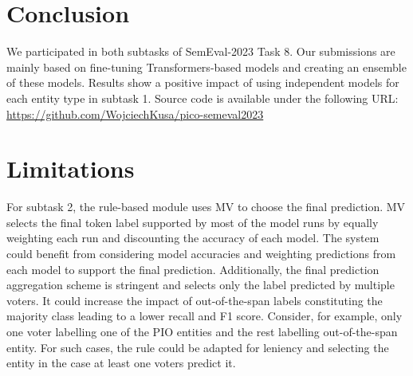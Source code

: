 \documentclass[11pt]{article}
\begin{document}
\section{Conclusion}
\label{sec:conclusion}
%
We participated in both subtasks of SemEval-2023 Task 8.
Our submissions are mainly based on fine-tuning Transformers-based models and creating an ensemble of these models.
Results show a positive impact of using independent models for each entity type in subtask 1.
Source code is available under the following URL: \url{https://github.com/WojciechKusa/pico-semeval2023}
%
%
%
\section*{Limitations}
\label{limitations}
%
For subtask 2, the rule-based module uses MV to choose the final prediction.
MV selects the final token label supported by most of the model runs by equally weighting each run and discounting the accuracy of each model.
The system could benefit from considering model accuracies and weighting predictions from each model to support the final prediction.
Additionally, the final prediction aggregation scheme is stringent and selects only the label predicted by multiple voters.
It could increase the impact of out-of-the-span labels constituting the majority class leading to a lower recall and F1 score.
Consider, for example, only one voter labelling one of the PIO entities and the rest labelling out-of-the-span entity.
For such cases, the rule could be adapted for leniency and selecting the entity in the case at least one voters predict it.
%
%
%


\end{document}

